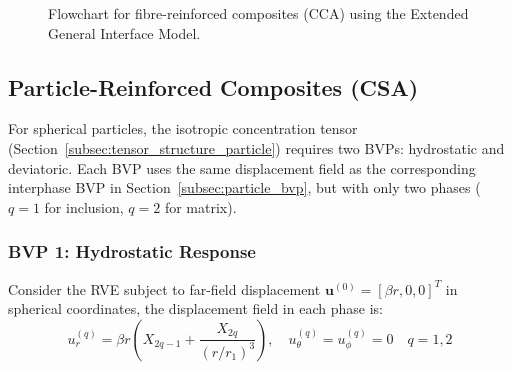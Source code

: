 \documentclass[oneside, 12pt, a4paper, bibliography=totoc]{book}
\newcommand{\bs}[1]{\bm{#1}}                       %
\begin{document}
\begin{figure}[htbp]
{%
}%
\caption{Flowchart for fibre-reinforced composites (CCA) using the Extended General Interface Model.}
\label{fig:flowchart_interface_cca}
\end{figure}

\subsection{Particle-Reinforced Composites (CSA)}
\label{subsec:interface_bvp_csa}

For spherical particles, the isotropic concentration tensor (Section~\ref{subsec:tensor_structure_particle}) requires two BVPs: hydrostatic and deviatoric. Each BVP uses the same displacement field as the corresponding interphase BVP in Section~\ref{subsec:particle_bvp}, but with only two phases ($q = 1$ for inclusion, $q = 2$ for matrix).

\subsubsection{BVP 1: Hydrostatic Response}
Consider the RVE subject to far-field displacement $\bs{u}^{(0)} = [\beta r, 0, 0]^T$ in spherical coordinates, the displacement field in each phase is:
%
\begin{equation}
    u_r^{(q)} = \beta r(X_{2q-1}  + \frac{X_{2q}}{(r/r_1)^3}), \quad u_\theta^{(q)} = u_\phi^{(q)} = 0 \quad q=1,2
\end{equation}
\end{document}
